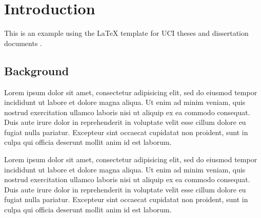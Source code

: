 \chapter{Introduction}
\label{chap:1}

This is an example using the \LaTeX{} template for UCI theses and dissertation
documents \citep{uci-thesis-latex:2016}.

\section{Background}

Lorem ipsum dolor sit amet, consectetur adipisicing elit, sed do
eiusmod tempor incididunt ut labore et dolore magna aliqua. Ut enim ad
minim veniam, quis nostrud exercitation ullamco laboris nisi ut
aliquip ex ea commodo consequat. Duis aute irure dolor in
reprehenderit in voluptate velit esse cillum dolore eu fugiat nulla
pariatur. Excepteur sint occaecat cupidatat non proident, sunt in
culpa qui officia deserunt mollit anim id est laborum.


Lorem ipsum dolor sit amet, consectetur adipisicing elit, sed do
eiusmod tempor incididunt ut labore et dolore magna aliqua. Ut enim ad
minim veniam, quis nostrud exercitation ullamco laboris nisi ut
aliquip ex ea commodo consequat. Duis aute irure dolor in
reprehenderit in voluptate velit esse cillum dolore eu fugiat nulla
pariatur. Excepteur sint occaecat cupidatat non proident, sunt in
culpa qui officia deserunt mollit anim id est laborum.

\ifchapterbib
    
    
\fi

